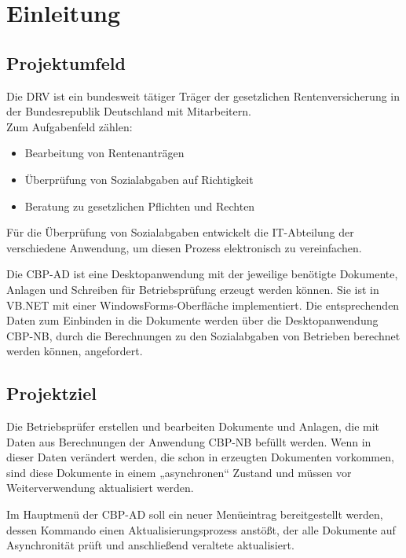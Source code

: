 
\section{Einleitung}
\label{sec:Einleitung}


\subsection{Projektumfeld} 
\label{sec:Projektumfeld}

Die \ac{DRV} ist ein bundesweit tätiger Träger der gesetzlichen Rentenversicherung in der Bundesrepublik Deutschland
mit  Mitarbeitern.\\
Zum Aufgabenfeld zählen:
\begin{itemize}
	\item Bearbeitung von Rentenanträgen
	\item Überprüfung von Sozialabgaben auf Richtigkeit
	\item Beratung zu gesetzlichen Pflichten und Rechten
\end{itemize}

Für die Überprüfung von Sozialabgaben entwickelt die IT-Abteilung der \DRV verschiedene Anwendung, um diesen Prozess elektronisch zu vereinfachen.

Die \ac{CBP-AD} ist eine Desktopanwendung mit der jeweilige benötigte Dokumente, Anlagen und Schreiben für Betriebsprüfung erzeugt werden können. Sie ist in \ac{VB}.NET mit einer WindowsForms-Oberfläche implementiert. Die entsprechenden Daten zum Einbinden in die Dokumente werden über die Desktopanwendung \ac{CBP-NB}, durch die Berechnungen zu den Sozialabgaben von Betrieben berechnet werden können, angefordert.


\subsection{Projektziel} 
\label{sec:Projektziel}

Die Betriebsprüfer erstellen und bearbeiten Dokumente und Anlagen, die mit Daten aus Berechnungen der Anwendung \acs{CBP-NB} befüllt werden. Wenn in dieser Daten verändert werden, die schon in erzeugten Dokumenten vorkommen, sind diese Dokumente in einem „asynchronen“ Zustand und müssen vor Weiterverwendung aktualisiert werden.

Im Hauptmenü der \acs{CBP-AD} soll ein neuer Menüeintrag bereitgestellt werden, dessen Kommando einen Aktualisierungsprozess anstößt, der alle Dokumente auf Asynchronität prüft und anschließend veraltete aktualisiert.

